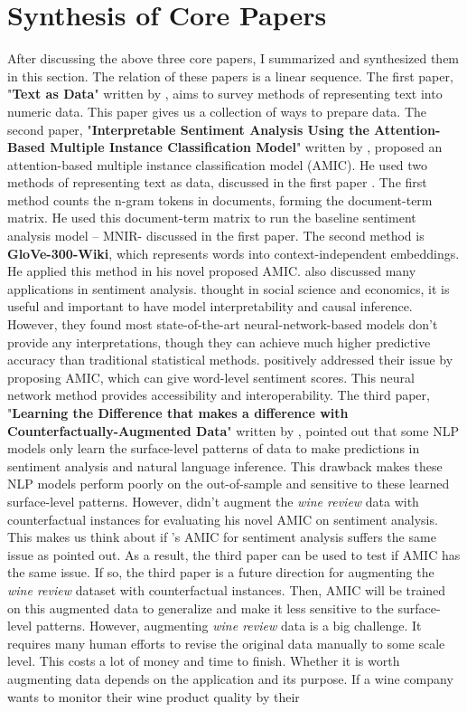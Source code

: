 \documentclass[aoas]{imsart}
\numberwithin{equation}{section}
\theoremstyle{plain}
\theoremstyle{remark}
\begin{document}
\section{Synthesis of Core Papers} After discussing the above three core papers, I summarized and synthesized them in this section. The relation of these papers is a linear sequence. The first paper, "\textbf{Text as Data}" written by \cite{10.1257/jel.20181020}, aims to survey methods of representing text into numeric data. This paper gives us a collection of ways to prepare data. The second paper, "\textbf{Interpretable Sentiment Analysis Using the Attention-Based Multiple Instance Classification Model}" written by \cite{chenyu}, proposed an attention-based multiple instance classification model (AMIC). He used two methods of representing text as data, discussed in the first paper \cite{10.1257/jel.20181020}. The first method counts the n-gram tokens in documents, forming the document-term matrix. He used this document-term matrix to run the baseline sentiment analysis model – MNIR- discussed in the first paper. The second method is \textbf{GloVe-300-Wiki}, which represents words into context-independent embeddings. He applied this method in his novel proposed AMIC. \cite{10.1257/jel.20181020} also discussed many applications in sentiment analysis. \cite{10.1257/jel.20181020} thought in social science and economics, it is useful and important to have model interpretability and causal inference. However, they found most state-of-the-art neural-network-based models don't provide any interpretations, though they can achieve much higher predictive accuracy than traditional statistical methods. \cite{chenyu} positively addressed their issue by proposing AMIC, which can give word-level sentiment scores. This neural network method provides accessibility and interoperability. The third paper, "\textbf{Learning the Difference that makes a difference with Counterfactually-Augmented Data}" written by \cite{DBLP:journals/corr/abs-1909-12434}, pointed out that some NLP models only learn the surface-level patterns of data to make predictions in sentiment analysis and natural language inference. This drawback makes these NLP models perform poorly on the out-of-sample and sensitive to these learned surface-level patterns. However, \cite{chenyu} didn't augment the \textit{wine review} data with counterfactual instances for evaluating his novel AMIC on sentiment analysis. This makes us think about if \cite{chenyu}'s AMIC for sentiment analysis suffers the same issue as \cite{DBLP:journals/corr/abs-1909-12434} pointed out. As a result, the third paper can be used to test if AMIC has the same issue. If so, the third paper is a future direction for augmenting the \textit{wine review} dataset with counterfactual instances. Then, AMIC will be trained on this augmented data to generalize and make it less sensitive to the surface-level patterns. However, augmenting \textit{wine review} data is a big challenge. It requires many human efforts to revise the original data manually to some scale level. This costs a lot of money and time to finish. Whether it is worth augmenting data depends on the application and its purpose. If a wine company wants to monitor their wine product quality by their 
\end{document}
